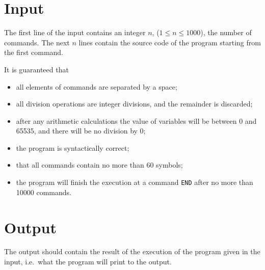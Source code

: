 \section*{Input}
The first line of the input contains an integer $n$, ($1 \leq n \leq 1000$), the number of commands.
The next $n$ lines contain the source code of the program starting from the first command.

It is guaranteed that
\begin{itemize}
    \item all elements of commands are separated by a space;
    \item all division operations are integer divisions, and the remainder is discarded;
    \item after any arithmetic calculations the value of variables will be between 0 and 65535, and there will be no division by 0;
    \item the program is syntactically correct;
    \item that all commands contain no more than 60 symbols;
    \item the program will finish the execution at a command \texttt{END} after no more than 10000 commands.
\end{itemize}

\section*{Output}
The output should contain the result of the execution of the program given in the input, i.e.~what the program will print to the output.

